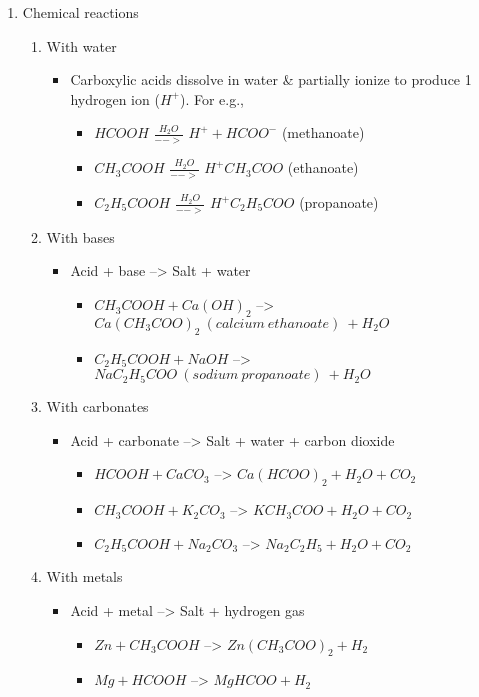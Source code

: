 \documentclass[11pt]{article}
\begin{document}
\begin{enumerate}
\item Chemical reactions
\label{sec:org4599691}
\begin{enumerate}
\item With water
\begin{itemize}
\item Carboxylic acids dissolve in water \& partially ionize to produce 1 hydrogen ion (\(H^+\)). For e.g.,
\begin{itemize}
\item \(HCOOH\) \(\frac{H_2O}{-->}\) \(H^+ + HCOO^-\) (methanoate)
\item \(CH_3COOH\) \(\frac{H_2O}{-->}\) \(H^+ CH_3COO\) (ethanoate)
\item \(C_2H_5COOH\) \(\frac{H_2O}{-->}\) \(H^+ C_2H_5COO\) (propanoate)
\end{itemize}
\end{itemize}
\item With bases
\begin{itemize}
\item Acid + base --> Salt + water
\begin{itemize}
\item \(CH_3COOH + Ca(OH)_2\) --> \(Ca(CH_3COO)_2\ (calcium\ ethanoate)\ + H_2O\)
\item \(C_2H_5COOH + NaOH\) --> \(NaC_2H_5COO\ (sodium\ propanoate)\ + H_2O\)
\end{itemize}
\end{itemize}
\item With carbonates
\begin{itemize}
\item Acid + carbonate --> Salt + water + carbon dioxide
\begin{itemize}
\item \(HCOOH + CaCO_3\) --> \(Ca(HCOO)_2 + H_2O + CO_2\)
\item \(CH_3COOH + K_2CO_3\) --> \(KCH_3COO + H_2O + CO_2\)
\item \(C_2H_5COOH + Na_2CO_3\) --> \(Na_2C_2H_5 + H_2O + CO_2\)
\end{itemize}
\end{itemize}
\item With metals
\begin{itemize}
\item Acid + metal --> Salt + hydrogen gas
\begin{itemize}
\item \(Zn + CH_3COOH\) --> \(Zn(CH_3COO)_2 + H_2\)
\item \(Mg + HCOOH\) --> \(MgHCOO + H_2\)
\end{itemize}
\end{itemize}
\end{enumerate}
\end{enumerate}
\end{document}
